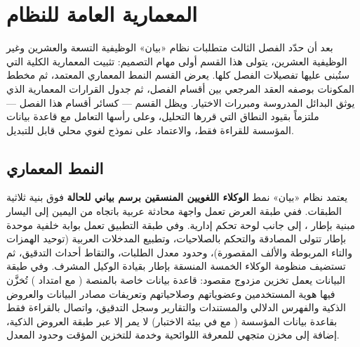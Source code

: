 %
%
%
\section{المعمارية العامة للنظام}
\label{sec:architecture}

بعد أن حدّد الفصل الثالث متطلبات نظام «بيان» الوظيفية التسعة والعشرين وغير الوظيفية العشرين، يتولى هذا القسم أولى مهام التصميم: تثبيت المعمارية الكلية التي ستُبنى عليها تفصيلات الفصل كلها. يعرض القسم النمط المعماري المعتمد، ثم مخطط المكونات بوصفه العقد المرجعي بين أقسام الفصل، ثم جدول القرارات المعمارية الذي يوثق البدائل المدروسة ومبررات الاختيار. ويظل القسم — كسائر أقسام هذا الفصل — ملتزماً بقيود النطاق التي قررها التحليل، وعلى رأسها التعامل مع قاعدة بيانات المؤسسة للقراءة فقط، والاعتماد على نموذج لغوي محلي قابل للتبديل.

\subsection{النمط المعماري}
\label{subsec:arch-pattern}

يعتمد نظام «بيان» نمط \textbf{الوكلاء اللغويين المنسقين برسم بياني للحالة} فوق بنية ثلاثية الطبقات. ففي طبقة العرض تعمل واجهة محادثة عربية باتجاه من اليمين إلى اليسار مبنية بإطار ، إلى جانب لوحة تحكم إدارية. وفي طبقة التطبيق تعمل بوابة خلفية موحدة بإطار  تتولى المصادقة والتحكم بالصلاحيات، وتطبيع المدخلات العربية (توحيد الهمزات والتاء المربوطة والألف المقصورة)، وحدود معدل الطلبات، والتقاط أحداث التدقيق، ثم تستضيف منظومة الوكلاء الخمسة المنسقة بإطار  \cite{langgraph2024} بقيادة الوكيل المشرف. وفي طبقة البيانات يعمل تخزين مزدوج مقصود: قاعدة بيانات خاصة بالمنصة ( مع امتداد ) تُخزَّن فيها هوية المستخدمين وعضوياتهم وصلاحياتهم وتعريفات مصادر البيانات والعروض الذكية والفهرس الدلالي والمستندات والتقارير وسجل التدقيق، واتصال بالقراءة فقط بقاعدة بيانات المؤسسة ( مع  في بيئة الاختبار) لا يمر إلا عبر طبقة العروض الذكية، إضافة إلى مخزن متجهي  \cite{qdrant2024} للمعرفة اللوائحية وخدمة  للتخزين المؤقت وحدود المعدل.

